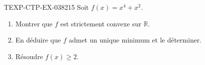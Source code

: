 \begin{exercice}{TEXP-CTP-EX-038}{2}{15}
Soit $f(x) = x^4 + x^2$.
\begin{enumerate}
  \item Montrer que $f$ est strictement convexe sur $\mathbb{R}$.
  \item En déduire que $f$ admet un unique minimum et le déterminer.
  \item Résoudre $f(x) \geq 2$.
\end{enumerate}

\end{exercice}

